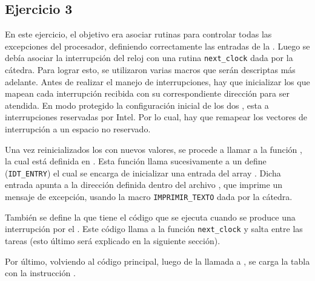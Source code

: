 \subsection{Ejercicio 3}
	En este ejercicio, el objetivo era asociar rutinas para controlar todas las excepciones del procesador, definiendo correctamente las entradas de 
la . Luego se debía asociar la interrupción del reloj con una rutina \verb=next_clock= dada por la cátedra. Para lograr esto, se utilizaron 
varias macros que serán descriptas más adelante. 
	Antes de realizar el manejo de interrupciones, hay que inicializar los  que mapean cada interrupción recibida con su correspondiente 
dirección para ser atendida. En modo protegido la configuración inicial de los dos , esta  a interrupciones reservadas por Intel. Por 
lo cual, hay que remapear los vectores de interrupción a un espacio no reservado.

	Una vez reinicializados los  con nuevos valores, se procede a llamar a la función , la cual está definida en . 
Esta función llama sucesivamente a un define (\verb=IDT_ENTRY=) el cual se encarga de inicializar una entrada del array . Dicha entrada 
apunta a la dirección definida dentro del archivo , que imprime un mensaje de excepción, usando la macro \verb=IMPRIMIR_TEXTO= dada por la 
cátedra.

	También se define la  que tiene el código que se ejecuta cuando se produce una interrupción por el . Este código llama 
a la función \verb=next_clock= y salta entre las tareas (esto último será explicado en la siguiente sección). 

	Por último, volviendo al código principal, luego de la llamada a , se carga la tabla  con la instrucción .
